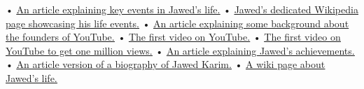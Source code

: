 \documentclass[12pt,a4paper]{article}
\begin{document}


• \href{https://real-leaders.com/jawed-karim-co-founder-youtube/}{\underline{An article explaining key events in Jawed's life.}}
\newline
• \href{https://en.wikipedia.org/wiki/Jawed_Karim}{\underline{Jawed's dedicated Wikipedia page showcasing his life events.}}
\newline
• \href{https://www.thequint.com/tech-and-auto/tech-news/youtube-turns-14-youtube-founders-steve-chen-jawed-karim-chad-hurley-2019#read-more}{\underline{An article explaining some background about the founders of YouTube.}}
\newline
• \href{https://youtu.be/jNQXAC9IVRw}{\underline{The first video on YouTube.}}
\newline
• \href{https://youtu.be/cTY4Yo2SR2o}{\underline{The first video on YouTube to get one million views.}}
\newline
• \href{https://valiantceo.com/jawed-karim/}{\underline{An article explaining Jawed's achievements.}}
\newline
• \href{https://www.vizaca.com/jawed-karim-entrepreneur/}{\underline{An article version of a biography of Jawed Karim.}}
\newline
• \href{https://handwiki.org/wiki/Biography:Jawed_Karim}{\underline{A wiki page about Jawed's life.}}
\newline
\end{document}

